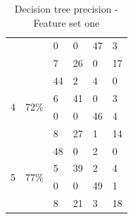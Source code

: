 \documentclass[USenglish]{ifimaster}  %
\begin{document}
\begin{table}[h]
\begin{tabular}{@{}llllll@{}}
			\multicolumn{1}{l|}{} & \multicolumn{1}{l|}{} & \multicolumn{1}{l|}{0} & \multicolumn{1}{l|}{0} & \multicolumn{1}{l|}{47} & 3 \\ \cmidrule(l){3-6} 
			\multicolumn{1}{l|}{} & \multicolumn{1}{l|}{} & \multicolumn{1}{l|}{7} & \multicolumn{1}{l|}{26} & \multicolumn{1}{l|}{0} & 17 \\ \midrule
			\multicolumn{1}{l|}{\multirow{4}{*}{4}} & \multicolumn{1}{l|}{\multirow{4}{*}{72\%}} & \multicolumn{1}{l|}{44} & \multicolumn{1}{l|}{2} & \multicolumn{1}{l|}{4} & 0 \\ \cmidrule(l){3-6} 
			\multicolumn{1}{l|}{} & \multicolumn{1}{l|}{} & \multicolumn{1}{l|}{6} & \multicolumn{1}{l|}{41} & \multicolumn{1}{l|}{0} & 3 \\ \cmidrule(l){3-6} 
			\multicolumn{1}{l|}{} & \multicolumn{1}{l|}{} & \multicolumn{1}{l|}{0} & \multicolumn{1}{l|}{0} & \multicolumn{1}{l|}{46} & 4 \\ \cmidrule(l){3-6} 
			\multicolumn{1}{l|}{} & \multicolumn{1}{l|}{} & \multicolumn{1}{l|}{8} & \multicolumn{1}{l|}{27} & \multicolumn{1}{l|}{1} & 14 \\ \midrule
			\multicolumn{1}{l|}{\multirow{4}{*}{5}} & \multicolumn{1}{l|}{\multirow{4}{*}{77\%}} & \multicolumn{1}{l|}{48} & \multicolumn{1}{l|}{0} & \multicolumn{1}{l|}{2} & 0 \\ \cmidrule(l){3-6} 
			\multicolumn{1}{l|}{} & \multicolumn{1}{l|}{} & \multicolumn{1}{l|}{5} & \multicolumn{1}{l|}{39} & \multicolumn{1}{l|}{2} & 4 \\ \cmidrule(l){3-6} 
			\multicolumn{1}{l|}{} & \multicolumn{1}{l|}{} & \multicolumn{1}{l|}{0} & \multicolumn{1}{l|}{0} & \multicolumn{1}{l|}{49} & 1 \\ \cmidrule(l){3-6} 
			\multicolumn{1}{l|}{} & \multicolumn{1}{l|}{} & \multicolumn{1}{l|}{8} & \multicolumn{1}{l|}{21} & \multicolumn{1}{l|}{3} & 18 \\ \bottomrule
		\end{tabular}
		\caption{Decision tree precision - Feature set one}
		\label{dt1e}
	\end{table}
	\FloatBarrier
\end{document}
